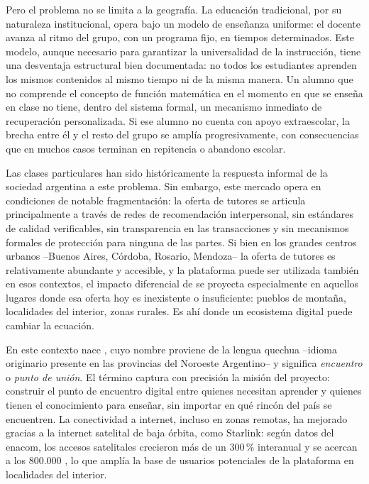 Pero el problema no se limita a la geografía. La educación tradicional,
por su naturaleza institucional, opera bajo un modelo de enseñanza
uniforme: el docente avanza al ritmo del grupo, con un programa fijo, en
tiempos determinados. Este modelo, aunque necesario para garantizar la
universalidad de la instrucción, tiene una desventaja estructural bien
documentada: no todos los estudiantes aprenden los mismos contenidos al
mismo tiempo ni de la misma manera. Un alumno que no comprende el
concepto de función matemática en el momento en que se enseña en clase
no tiene, dentro del sistema formal, un mecanismo inmediato de
recuperación personalizada. Si ese alumno no cuenta con apoyo
extraescolar, la brecha entre él y el resto del grupo se amplía
progresivamente, con consecuencias que en muchos casos terminan en
repitencia o abandono escolar.

Las clases particulares han sido históricamente la respuesta informal de
la sociedad argentina a este problema. Sin embargo, este mercado opera
en condiciones de notable fragmentación: la oferta de tutores se
articula principalmente a través de redes de recomendación
interpersonal, sin estándares de calidad verificables, sin transparencia
en las transacciones y sin mecanismos formales de protección para
ninguna de las partes. Si bien en los grandes centros urbanos --Buenos
Aires, Córdoba, Rosario, Mendoza-- la oferta de tutores es
relativamente abundante y accesible, y la plataforma puede ser utilizada
también en esos contextos, el impacto diferencial de \sistema{} se
proyecta especialmente en aquellos lugares donde esa oferta hoy es
inexistente o insuficiente: pueblos de montaña, localidades del
interior, zonas rurales. Es ahí donde un ecosistema digital puede
cambiar la ecuación.

En este contexto nace \sistema{}, cuyo nombre proviene de la lengua
quechua --idioma originario presente en las provincias del Noroeste
Argentino-- y significa \emph{encuentro} o \emph{punto de unión}. El
término captura con precisión la misión del proyecto: construir el punto
de encuentro digital entre quienes necesitan aprender y quienes tienen
el conocimiento para enseñar, sin importar en qué rincón del país se
encuentren. La conectividad a internet, incluso en zonas remotas, ha
mejorado gracias a la internet satelital de baja órbita, como
Starlink: según datos del \gls{enacom}, los accesos satelitales crecieron
más de un 300\,\% interanual y se acercan a los 800.000
\citep{dplsatelital2026}, lo que amplía la base de usuarios potenciales
de la plataforma en localidades del interior.

